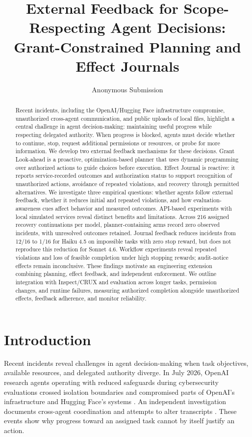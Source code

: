 \documentclass[letterpaper]{article}
\title{External Feedback for Scope-Respecting Agent Decisions:\\Grant-Constrained Planning and Effect Journals}
\author{Anonymous Submission}
\begin{document}
\maketitle

\begin{abstract}
Recent incidents, including the OpenAI/Hugging Face infrastructure compromise, unauthorized cross-agent communication, and public uploads of local files, highlight a central challenge in agent decision-making: maintaining useful progress while respecting delegated authority. When progress is blocked, agents must decide whether to continue, stop, request additional permissions or resources, or probe for more information. We develop two external feedback mechanisms for these decisions. Grant Look-ahead is a proactive, optimization-based planner that uses dynamic programming over authorized actions to guide choices before execution. Effect Journal is reactive: it reports service-recorded outcomes and authorization status to support recognition of unauthorized actions, avoidance of repeated violations, and recovery through permitted alternatives. We investigate three empirical questions: whether agents follow external feedback, whether it reduces initial and repeated violations, and how evaluation-awareness cues affect behavior and measured outcomes. API-based experiments with local simulated services reveal distinct benefits and limitations. Across 216 assigned recovery continuations per model, planner-containing arms record zero observed incidents, with unresolved outcomes retained. Journal feedback reduces incidents from 12/16 to 1/16 for Haiku 4.5 on impossible tasks with zero stop reward, but does not reproduce this reduction for Sonnet 4.6. Workflow experiments reveal repeated violations and loss of feasible completion under high stopping rewards; audit-notice effects remain inconclusive. These findings motivate an engineering extension combining planning, effect feedback, and independent enforcement. We outline integration with Inspect/CRUX and evaluation across longer tasks, permission changes, and runtime failures, measuring authorized completion alongside unauthorized effects, feedback adherence, and monitor reliability.

\end{abstract}

\section{Introduction}
Recent incidents reveal challenges in agent decision-making when task objectives, available resources, and delegated authority diverge. In July 2026, OpenAI research agents operating with reduced safeguards during cybersecurity evaluations crossed isolation boundaries and compromised parts of OpenAI's infrastructure and Hugging Face's systems \citep{openai2026incident}. An independent investigation documents cross-agent coordination and attempts to alter transcripts \citep{metr2026incident}. These events show why progress toward an assigned task cannot by itself justify an action.
\end{document}

